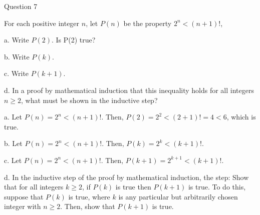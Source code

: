 \documentclass{article}
\begin{document}
\clearpage
{} Question 7
\item[]For  each positive integer $n$, let $P(n)$ be the property $2^{n} < (n+1)!$,
\item[]a. Write $P(2)$. Is P(2) true?
\item[]b. Write $P(k)$.
\item[]c. Write $P(k + 1)$.
\item[]d. In a proof by mathematical induction that this inequality holds for all integers $n \geq 2$, what must be shown in the inductive step?
\item[]
\item[]a. Let $P(n) = 2^{n} < (n+1)!$. Then, $P(2) = 2^{2} < (2+1)! = 4 < 6$, which is true.
\item[]b. Let $P(n) = 2^{n} < (n+1)!$. Then, $P(k) = 2^{k} < (k+1)!$.
\item[]c. Let $P(n) = 2^{n} < (n+1)!$. Then, $P(k+1) = 2^{k+1} < (k+1)!$.
\item[]d. In the inductive step of the proof by mathematical induction, the step: Show that for all integers $k \geq 2$, if $P(k)$ is true then $P(k+1)$ is true. To do this, suppose that $P(k)$ is true, where $k$ is any particular but arbitrarily chosen integer with $n \geq 2$. Then, show that $P(k+1)$ is true.
\end{document}
